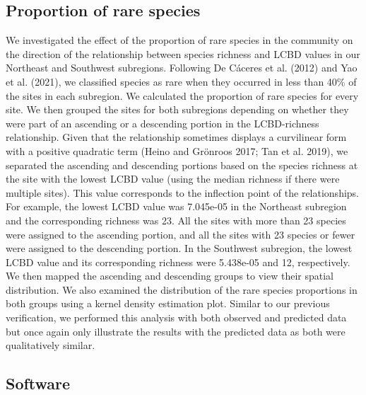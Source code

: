 \documentclass[10pt,oneside]{article}
\begin{document}
\hypertarget{proportion-of-rare-species}{%
\subsection{Proportion of rare
species}\label{proportion-of-rare-species}}

We investigated the effect of the proportion of rare species in the
community on the direction of the relationship between species richness
and LCBD values in our Northeast and Southwest subregions. Following De
Cáceres et al. (2012) and Yao et al. (2021), we classified species as
rare when they occurred in less than 40\% of the sites in each
subregion. We calculated the proportion of rare species for every site.
We then grouped the sites for both subregions depending on whether they
were part of an ascending or a descending portion in the LCBD-richness
relationship. Given that the relationship sometimes displays a
curvilinear form with a positive quadratic term (Heino and Grönroos
2017; Tan et al. 2019), we separated the ascending and descending
portions based on the species richness at the site with the lowest LCBD
value (using the median richness if there were multiple sites). This
value corresponds to the inflection point of the relationships. For
example, the lowest LCBD value was 7.045e-05 in the Northeast subregion
and the corresponding richness was 23. All the sites with more than 23
species were assigned to the ascending portion, and all the sites with
23 species or fewer were assigned to the descending portion. In the
Southwest subregion, the lowest LCBD value and its corresponding
richness were 5.438e-05 and 12, respectively. We then mapped the
ascending and descending groups to view their spatial distribution. We
also examined the distribution of the rare species proportions in both
groups using a kernel density estimation plot. Similar to our previous
verification, we performed this analysis with both observed and
predicted data but once again only illustrate the results with the
predicted data as both were qualitatively similar.

\hypertarget{software}{%
\subsection{Software}\label{software}}
\end{document}
